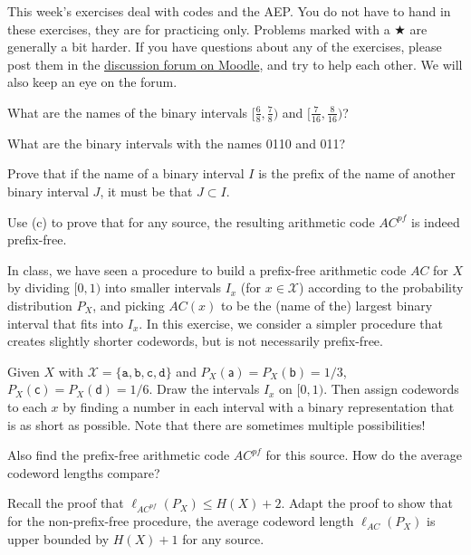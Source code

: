 \documentclass[a4paper,10pt,landscape,twocolumn]{scrartcl}
\begin{document}
\practiceproblems

{\sffamily\noindent
This week's exercises deal with codes and the AEP. You do not have to hand in these exercises, they are for practicing only. Problems marked with a $\bigstar$ are generally a bit harder. If you have questions about any of the exercises, please post them in the \href{https://www.moodle.ch/lms/mod/forum/view.php?id=1761}{discussion forum on Moodle}, and try to help each other. We will also keep an eye on the forum.
}

\begin{exercise}
	\begin{subex}
	What are the names of the binary intervals $[\frac{6}{8},\frac{7}{8})$ and $[\frac{7}{16},\frac{8}{16})$?
	\end{subex}
	\begin{subex}
	What are the binary intervals with the names 0110 and 011?
	\end{subex}
	\begin{subex}
	Prove that if the name of a binary interval $I$ is the prefix of the name of another binary interval $J$, it must be that $J \subset I$.
	\end{subex}
	\begin{subex}
	Use (c) to prove that for any source, the resulting arithmetic code $AC^{pf}$ is indeed prefix-free.
	\end{subex}
\end{exercise}

\begin{exercise}
In class, we have seen a procedure to build a prefix-free arithmetic code $AC$ for $X$ by dividing $[0,1)$ into smaller intervals $I_x$ (for $x \in \mathcal{X}$) according to the probability distribution $P_X$, and picking $AC(x)$ to be the (name of the) largest binary interval that fits into $I_x$. In this exercise, we consider a simpler procedure that creates slightly shorter codewords, but is not necessarily prefix-free.
	\begin{subex}
	Given $X$ with $\mathcal{X} = \{\mathtt{a,b,c,d}\}$ and $P_X(\mathsf{a}) = P_X(\mathsf{b}) = 1/3$, $P_X(\mathsf{c}) = P_X(\mathsf{d}) = 1/6$. Draw the intervals $I_x$ on $[0,1)$. Then assign codewords to each $x$ by finding a number in each interval with a binary representation that is as short as possible. Note that there are sometimes multiple possibilities!
	\end{subex}
	\begin{subex}
	Also find the prefix-free arithmetic code $AC^{pf}$ for this source. How do the average codeword lengths compare?
	\end{subex}
	\begin{subex}
	Recall the proof that $\ell_{AC^{pf}}(P_X) \leq H(X) + 2$. Adapt the proof to show that for the non-prefix-free procedure, the average codeword length $\ell_{AC}(P_X)$ is upper bounded by $H(X) + 1$ for any source.
	\end{subex}
\end{exercise}
\end{document}
